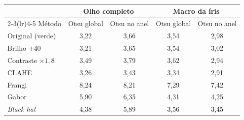 \begin{tabular}{lcccc}
\toprule
 & \multicolumn{2}{c}{Olho completo} & \multicolumn{2}{c}{Macro da íris} \\
\cmidrule(lr){2-3}\cmidrule(lr){4-5}
Método & Otsu global & Otsu no anel & Otsu global & Otsu no anel \\
\midrule
Original (verde) & 3,22 & 3,66 & 3,54 & 2,98 \\
Brilho $+40$ & 3,21 & 3,65 & 3,54 & 3,02 \\
Contraste $\times1{,}8$ & 3,49 & 3,79 & 3,62 & 2,94 \\
CLAHE & 3,26 & 3,43 & 3,34 & 2,91 \\
Frangi & 8,24 & 8,21 & 7,29 & 7,42 \\
Gabor & 5,90 & 6,35 & 4,31 & 4,25 \\
\textit{Black-hat} & 4,38 & 5,89 & 3,56 & 3,45 \\
\bottomrule
\end{tabular}
